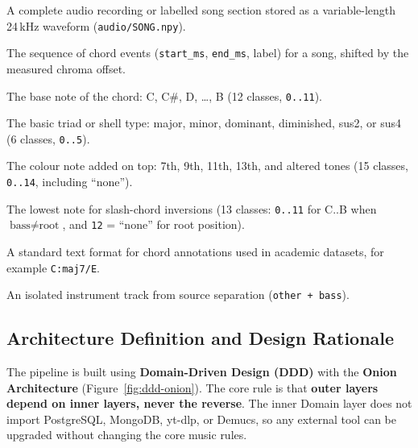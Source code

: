 \documentclass[a4paper]{article}
\begin{document}
\begin{tcolorbox}[colback=blue!4, colframe=blue!50!black, title={Terms used in this chapter}, fonttitle=\bfseries\small, boxrule=0.6pt, left=4pt, right=4pt, top=3pt, bottom=3pt]
\small
\begin{description}[leftmargin=2.4cm, labelwidth=2.2cm, itemsep=1pt, topsep=2pt]
    \item[Section / Song] A complete audio recording or labelled song section stored as a variable-length 24\,kHz waveform (\texttt{audio/SONG.npy}).
    \item[Timeline] The sequence of chord events (\texttt{start\_ms}, \texttt{end\_ms}, label) for a song, shifted by the measured chroma offset.
    \item[Root] The base note of the chord: C, C\#, D, \dots, B (12 classes, \texttt{0..11}).
    \item[Quality] The basic triad or shell type: major, minor, dominant, diminished, sus2, or sus4 (6 classes, \texttt{0..5}).
    \item[Extension] The colour note added on top: 7th, 9th, 11th, 13th, and altered tones (15 classes, \texttt{0..14}, including ``none'').
    \item[Bass] The lowest note for slash-chord inversions (13 classes: \texttt{0..11} for C..B when $\text{bass} \neq \text{root}$, and \texttt{12} = ``none'' for root position).
    \item[Harte] A standard text format for chord annotations used in academic datasets, for example \texttt{C:maj7/E}.
    \item[Stem] An isolated instrument track from source separation (\texttt{other + bass}).
\end{description}
\end{tcolorbox}

\subsection{Architecture Definition and Design Rationale}

The pipeline is built using \textbf{Domain-Driven Design (DDD)} with the \textbf{Onion Architecture} (Figure~\ref{fig:ddd-onion}). The core rule is that \textbf{outer layers depend on inner layers, never the reverse}. The inner Domain layer does not import PostgreSQL, MongoDB, yt-dlp, or Demucs, so any external tool can be upgraded without changing the core music rules.
\end{document}
